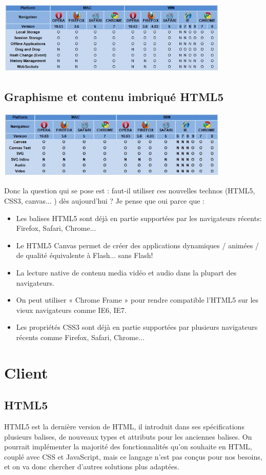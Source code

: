 \documentclass[a4paper,10pt]{report}
\begin{document}
 \includegraphics[width=420px]{img/HTML5-WebApp.jpg}

\section{Graphisme et contenu imbriqué HTML5}

 \includegraphics[width=420px]{img/Graphics.jpg}


Donc la question qui se pose est : faut-il utiliser ces nouvelles technos (HTML5, CSS3, canvas... ) dès aujourd'hui ?
Je pense que oui parce que :
\begin{itemize}
  \item Les balises HTML5 sont déjà en partie supportées par les navigateurs récents: Firefox, Safari, Chrome...
  \item Le HTML5 Canvas permet de créer des applications dynamiques / animées / de qualité équivalente à Flash... sans Flash!
  \item La lecture native de contenu media vidéo et audio dans la plupart des navigateurs.
  \item On peut utiliser « Chrome Frame » pour rendre compatible l'HTML5 sur les vieux navigateurs comme IE6, IE7.
  \item Les propriétés CSS3 sont déjà en partie supportées par plusieurs navigateurs récents comme Firefox, Safari, Chrome...
\end{itemize}

\chapter{Client}

\section{HTML5}
HTML5 est la dernière version de HTML, il introduit dans ses spécifications plusieurs 
balises, 
de nouveaux types et attributs pour les anciennes balises. 
On pourrait implémenter la majorité des fonctionnalités qu'on souhaite en HTML, couplé 
avec CSS et JavaScript, mais ce langage n'est pas conçus pour nos besoins, et on va donc 
chercher d'autres solutions plus adaptées. 
\end{document}

